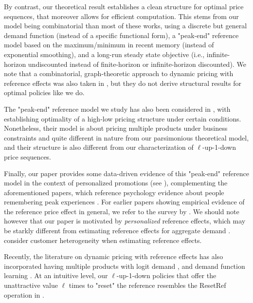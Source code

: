 \documentclass[format=acmsmall, review=false]{acmart}
\newcommand{\luid}{$\ell$-up-1-down\xspace}
\begin{document}
By contrast, our theoretical result establishes a clean structure for optimal price sequences, that moreover allows for efficient computation.
This stems from our model being combinatorial than most of these works, using a discrete but general demand function (instead of a specific functional form), a "peak-end" reference model based on the maximum/minimum in recent memory (instead of exponential smoothing), and a long-run steady state objective (i.e., infinite-horizon undiscounted instead of finite-horizon or infinite-horizon discounted).
We note that a combinatorial, graph-theoretic approach to dynamic pricing with reference effects was also taken in \citet{cohen2020efficient}, but they do not derive structural results for optimal policies like we do.

The "peak-end" reference model we study has also been considered in \citet{nasiry2011dynamic,cohen2020efficient,cohen2023high}, with \citet{cohen2023high} establishing optimality of a high-low pricing structure under certain conditions.  Nonetheless, their model is about pricing multiple products under business constraints and quite different in nature from our parsimonious theoretical model, and their structure is also different from our characterization of \luid price sequences.

Finally, our paper provides some data-driven evidence of this "peak-end" reference model in the context of personalized promotions (see ), complementing the aforementioned papers, which reference psychology evidence about people remembering peak experiences \citep{kahneman1993more}.
For earlier papers showing empirical evidence of the reference price effect in general, we refer to the survey by \citet{mazumdar2005reference}.
We should note however that our paper is motivated by \textit{personalized} reference effects, which may be starkly different from estimating reference effects for aggregate demand \citep{hu2018markets}.  \citet{jiang2024intertemporal} consider customer heterogeneity when estimating reference effects.

Recently, the literature on dynamic pricing with reference effects has also incorporated having multiple products with logit demand \citep{guo2025multiproduct}, and demand function learning \citep{den2022dynamic,agrawal2024dynamic}.  At an intuitive level, our \luid policies that offer the unattractive value $\ell$ times to "reset" the reference resembles the ResetRef operation in \citet{agrawal2024dynamic}.
\end{document}
